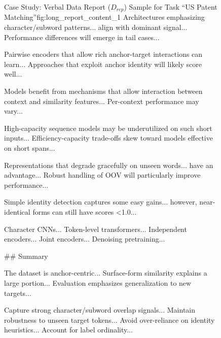 \begin{figure}
\begin{ReportFrame}{Case Study: Verbal Data Report ($D_{rep}$) Sample for Task ``US Patent Matching''}{fig:long_report_content_1}
Architectures emphasizing character/subword patterns... align with dominant signal... Performance differences will emerge in tail cases...

Pairwise encoders that allow rich anchor-target interactions can learn... Approaches that exploit anchor identity will likely score well...

Models benefit from mechanisms that allow interaction between context and similarity features... Per-context performance may vary...

High-capacity sequence models may be underutilized on such short inputs... Efficiency-capacity trade-offs skew toward models effective on short spans...

Representations that degrade gracefully on unseen words... have an advantage... Robust handling of OOV will particularly improve performance...

Simple identity detection captures some easy gains... however, near-identical forms can still have scores <1.0...

Character CNNs... Token-level transformers... Independent encoders... Joint encoders... Denoising pretraining...
\newline

\#\# Summary

The dataset is anchor-centric... Surface-form similarity explains a large portion... Evaluation emphasizes generalization to new targets...

Capture strong character/subword overlap signals... Maintain robustness to unseen target tokens... Avoid over-reliance on identity heuristics... Account for label ordinality...
    
\end{ReportFrame}
    
\label{fig:report_patent}

\end{figure}




